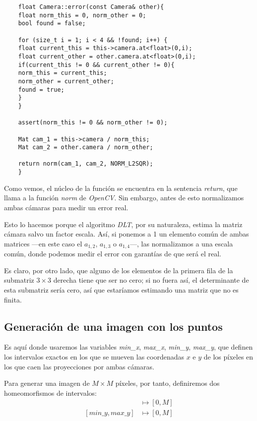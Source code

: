 \documentclass[a4paper, 11pt]{article}
\theoremstyle{definition}
\theoremstyle{theorem}
\begin{document}
    \begin{lstlisting}
    float Camera::error(const Camera& other){
    float norm_this = 0, norm_other = 0;
    bool found = false;

    for (size_t i = 1; i < 4 && !found; i++) {
    float current_this = this->camera.at<float>(0,i);
    float current_other = other.camera.at<float>(0,i);
    if(current_this != 0 && current_other != 0){
    norm_this = current_this;
    norm_other = current_other;
    found = true;
    }
    }

    assert(norm_this != 0 && norm_other != 0);

    Mat cam_1 = this->camera / norm_this;
    Mat cam_2 = other.camera / norm_other;

    return norm(cam_1, cam_2, NORM_L2SQR);
    }
    \end{lstlisting}

    Como vemos, el núcleo de la función se encuentra en la sentencia \emph{return}, que llama a la función \emph{norm} de \emph{OpenCV}. Sin embargo, antes de esto normalizamos ambas cámaras para medir un error real.

    Esto lo hacemos porque el algoritmo \emph{DLT}, por su naturaleza, estima la matriz cámara salvo un factor escala. Así, si ponemos a 1 un elemento común de ambas matrices ---en este caso el $a_{1,2}$, $a_{1,3}$ o $a_{1,4}$---, las normalizamos a una escala común, donde podemos medir el error con garantías de que será el real.

    Es claro, por otro lado, que alguno de los elementos de la primera fila de la submatriz $3\times3$ derecha tiene que ser no cero; si no fuera así, el determinante de esta submatriz sería cero, así que estaríamos estimando una matriz que no es finita.

    \subsection{Generación de una imagen con los puntos}
    Es aquí donde usaremos las variables \emph{min\_x}, \emph{max\_x}, \emph{min\_y}, \emph{max\_y}, que definen los intervalos exactos en los que se mueven las coordenadas $x$ e $y$ de los píxeles en los que caen las proyecciones por ambas cámaras.

    Para generar una imagen de $M \times M$ píxeles, por tanto, definiremos dos homeomorfismos de intervalos:
    \begin{align*}
        [min\_x, max\_x] &\longmapsto [0, M] \\
        [min\_y, max\_y] &\longmapsto [0, M]
    \end{align*}
\end{document}
